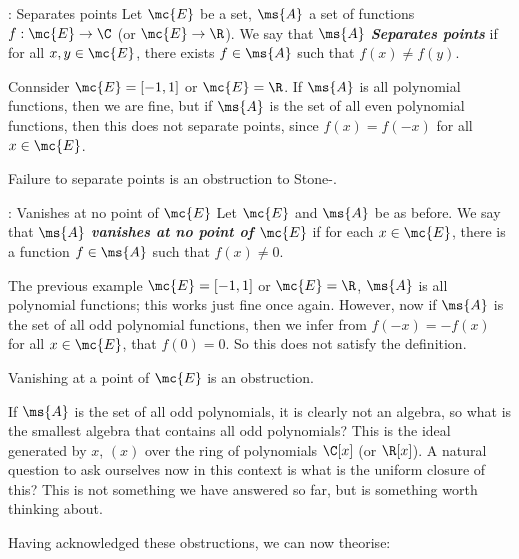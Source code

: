 \begin{ndef}{: Separates points}
    Let \(\mc{E}\) be a set, \(\ms{A}\) a set of functions \(f:\mc{E}\to\C\) (or \(\mc{E}\to\R\)). We say that \(\ms{A}\) \emph{\textbf{Separates points}} if for all \(x,y\in\mc{E}\), there exists \(f\in\ms{A}\) such that \(f(x)\neq f(y)\).
\end{ndef}

\begin{example}
    Connsider \(\mc{E}=[-1,1]\) or \(\mc{E}=\R\). If \(\ms{A}\) is all polynomial functions, then we are fine, but if \(\ms{A}\) is the set of all even polynomial functions, then this does not separate points, since \(f(x)=f(-x)\) for all \(x\in\mc{E}\).
\end{example}
Failure to separate points is an obstruction to Stone-\Weierstass.

\begin{ndef}{: Vanishes at no point of \(\mc{E}\)}
    Let \(\mc{E}\) and \(\ms{A}\) be as before. We say that \(\ms{A}\) \emph{\textbf{vanishes at no point of \(\mc{E}\)}} if for each \(x\in\mc{E}\), there is a function \(f\in\ms{A}\) such that \(f(x)\neq 0\).
\end{ndef}
\begin{example}
    The previous example \(\mc{E}=[-1,1]\) or \(\mc{E}=\R\), \(\ms{A}\) is all polynomial functions; this works just fine once again. However, now if \(\ms{A}\) is the set of all odd polynomial functions, then we infer from \(f(-x)=-f(x)\) for all \(x\in\mc{E}\), that \(f(0)=0\). So this does not satisfy the definition.
\end{example}
Vanishing at a point of \(\mc{E}\) is an obstruction.
\begin{digression}
    If \(\ms{A}\) is the set of all odd polynomials, it is clearly not an algebra, so what is the smallest algebra that contains all odd polynomials? This is the ideal generated by \(x\), \((x)\) over the ring of polynomials \(\C[x]\) (or \(\R[x]\)). A natural question to ask ourselves now in this context is what is the uniform closure of this? This is not something we have answered so far, but is something worth thinking about.
\end{digression}

Having acknowledged these obstructions, we can now theorise:

